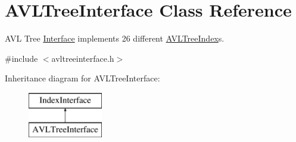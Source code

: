 \hypertarget{class_a_v_l_tree_interface}{}\section{A\+V\+L\+Tree\+Interface Class Reference}
\label{class_a_v_l_tree_interface}


A\+V\+L Tree \hyperlink{class_interface}{Interface} implements 26 different \hyperlink{class_a_v_l_tree_index}{A\+V\+L\+Tree\+Index}\textquotesingle{}s.  




{\ttfamily \#include $<$avltreeinterface.\+h$>$}

Inheritance diagram for A\+V\+L\+Tree\+Interface\+:\begin{figure}[H]
\begin{center}
\leavevmode
\includegraphics[height=2.000000cm]{class_a_v_l_tree_interface}
\end{center}
\end{figure}
